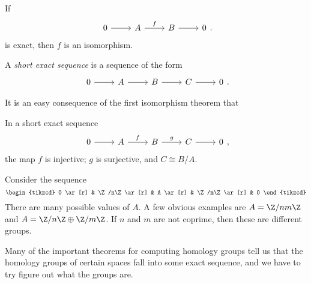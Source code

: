 \documentclass[a4paper]{article}
\begin{document}
\begin{eg}
  If
  \[
    \begin{tikzcd}
      0 \ar[r] & A \ar[r, "f"] & B \ar[r] & 0
    \end{tikzcd}.
  \]
  is exact, then $f$ is an isomorphism.
\end{eg}

\begin{defi}
  A \emph{short exact sequence} is a sequence of the form
  \[
    \begin{tikzcd}
      0 \ar[r] & A \ar[r] & B \ar[r] & C \ar[r] & 0
    \end{tikzcd}.
  \]
\end{defi}
It is an easy consequence of the first isomorphism theorem that
\begin{lemma}
  In a short exact sequence
  \[
    \begin{tikzcd}
      0 \ar[r] & A \ar[r, "f"] & B \ar[r, "g"] & C \ar[r] & 0
    \end{tikzcd},
  \]
  the map $f$ is injective; $g$ is surjective, and $C \cong B/A$.
\end{lemma}

\begin{eg}
  Consider the sequence
  \[
    \begin{tikzcd}
      0 \ar[r] & \Z/n\Z \ar[r] & A \ar[r] & \Z/m\Z \ar[r] & 0
    \end{tikzcd}
  \]
  There are many possible values of $A$. A few obvious examples are $A = \Z/nm\Z$ and $A = \Z/n\Z \oplus \Z/m\Z$. If $n$ and $m$ are not coprime, then these are different groups.
\end{eg}
Many of the important theorems for computing homology groups tell us that the homology groups of certain spaces fall into some exact sequence, and we have to try figure out what the groups are.
\end{document}
